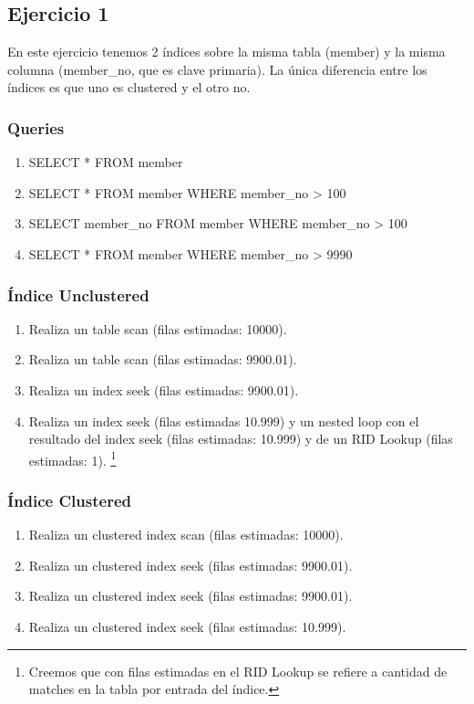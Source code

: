 
\subsection{Ejercicio 1}
En este ejercicio tenemos 2 índices sobre la misma tabla (member) y la misma columna (member\_no, que es clave primaria).
La única diferencia entre los índices es que uno es clustered y el otro no.

\subsubsection{Queries}

\begin{enumerate}[label=(\alph*)]
\item SELECT * FROM member
\item SELECT * FROM member WHERE member\_no > 100
\item SELECT member\_no FROM member WHERE member\_no > 100
\item SELECT * FROM member WHERE member\_no > 9990
\end{enumerate}

\subsubsection{Índice Unclustered}
\begin{enumerate}[label=(\alph*)]
  \item Realiza un table scan (filas estimadas: 10000).
  \item Realiza un table scan (filas estimadas: 9900.01).
  \item Realiza un index seek (filas estimadas: 9900.01).
  \item Realiza un index seek (filas estimadas 10.999) y un nested loop con el resultado del index seek (filas estimadas: 10.999) y de un RID Lookup (filas estimadas: 1).
  \footnote{Creemos que con filas estimadas en el RID Lookup se refiere a cantidad de matches en la tabla por entrada del índice.}
\end{enumerate}

\subsubsection{Índice Clustered}
\begin{enumerate}[label=(\alph*)]
  \item Realiza un clustered index scan (filas estimadas: 10000).
  \item Realiza un clustered index seek (filas estimadas: 9900.01).
  \item Realiza un clustered index seek (filas estimadas: 9900.01).
  \item Realiza un clustered index seek (filas estimadas: 10.999).
\end{enumerate}

